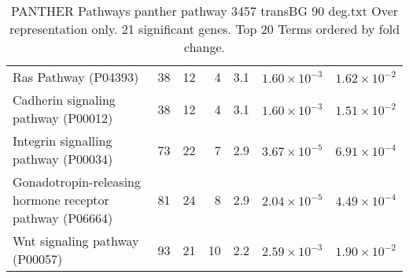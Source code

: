 \begin{table}[ht]
\begin{adjustbox}{width=\textwidth}
\begin{tabular}{lrrrrrr}
  Ras Pathway (P04393) & 38 & 12 & 4 & 3.1 & $1.60 \times 10^{-3}$ & $1.62 \times 10^{-2}$ \\ 
  Cadherin signaling pathway (P00012) & 38 & 12 & 4 & 3.1 & $1.60 \times 10^{-3}$ & $1.51 \times 10^{-2}$ \\ 
  Integrin signalling pathway (P00034) & 73 & 22 & 7 & 2.9 & $3.67 \times 10^{-5}$ & $6.91 \times 10^{-4}$ \\ 
  Gonadotropin-releasing hormone receptor pathway (P06664) & 81 & 24 & 8 & 2.9 & $2.04 \times 10^{-5}$ & $4.49 \times 10^{-4}$ \\ 
  Wnt signaling pathway (P00057) & 93 & 21 & 10 & 2.2 & $2.59 \times 10^{-3}$ & $1.90 \times 10^{-2}$ \\ 
   \hline
\end{tabular}
\end{adjustbox}
\caption{PANTHER Pathways panther pathway 3457 transBG 90 deg.txt Over representation only. 21 significant genes. Top 20 Terms ordered by fold change. } 
\label{tab:PANTHER Pathways panther pathway 3457 transBG 90 deg.txt Over representation only. 21 significant genes. Top 20 Terms ordered by fold change. }
\end{table}


